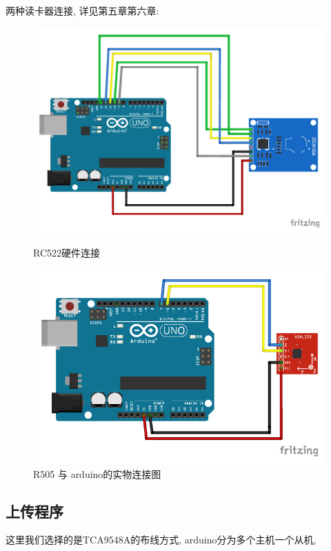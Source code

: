 \documentclass{article}
\begin{document}
两种读卡器连接, 详见第五章第六章:
\begin{figure}[h]
	\centering
	\begin{minipage}{.45\textwidth}
		\centering
		\includegraphics[width=\linewidth]{../../5_Chapter5_RC522/Picture/RFID_RC522.pdf}
		\caption{RC522硬件连接}
		\label{fig:RC522硬件连接}
	\end{minipage}%
	\hfill
  \begin{minipage}{.45\textwidth}
		\centering
		\includegraphics[width=\linewidth]{../../6_Chapter6_UHF_R505/Picture/R505.pdf}
		\caption{R505 与 arduino的实物连接图}
		\label{fig:R505 与 arduino的实物连接图}
	\end{minipage}
\end{figure}

\subsection{上传程序}
这里我们选择的是TCA9548A的布线方式, arduino分为多个主机一个从机, 
\end{document}

